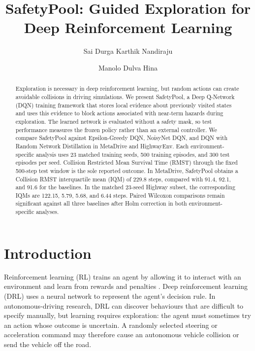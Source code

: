 \documentclass[runningheads]{llncs}
\begin{document}
\raggedright

\title{SafetyPool: Guided Exploration for Deep Reinforcement Learning}

\author{Sai Durga Karthik Nandiraju \and Manolo Dulva Hina}

\maketitle

\begin{abstract}
Exploration is necessary in deep reinforcement learning, but random actions can create avoidable collisions in driving simulations. We present SafetyPool, a Deep Q-Network (DQN) training framework that stores local evidence about previously visited states and uses this evidence to block actions associated with near-term hazards during exploration. The learned network is evaluated without a safety mask, so test performance measures the frozen policy rather than an external controller. We compare SafetyPool against Epsilon-Greedy DQN, NoisyNet DQN, and DQN with Random Network Distillation in MetaDrive and HighwayEnv. Each environment-specific analysis uses 23 matched training seeds, 500 training episodes, and 300 test episodes per seed. Collision Restricted Mean Survival Time (RMST) through the fixed 500-step test window is the sole reported outcome. In MetaDrive, SafetyPool obtains a Collision RMST interquartile mean (IQM) of 229.8 steps, compared with 91.4, 92.1, and 91.6 for the baselines. In the matched 23-seed Highway subset, the corresponding IQMs are 122.15, 5.79, 5.68, and 6.44 steps. Paired Wilcoxon comparisons remain significant against all three baselines after Holm correction in both environment-specific analyses.

\end{abstract}

\section{Introduction}

Reinforcement learning (RL) trains an agent by allowing it to interact with an environment and learn from rewards and penalties \cite{sutton2018reinforcement}. Deep reinforcement learning (DRL) uses a neural network to represent the agent's decision rule. In autonomous-driving research, DRL can discover behaviours that are difficult to specify manually, but learning requires exploration: the agent must sometimes try an action whose outcome is uncertain. A randomly selected steering or acceleration command may therefore cause an autonomous vehicle collision or send the vehicle off the road.
\end{document}
